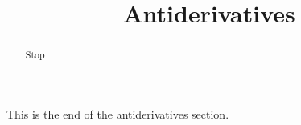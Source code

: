 \documentclass[handout]{ximera}
\title{Antiderivatives}
\begin{document}
\begin{abstract} Stop
\end{abstract}

\maketitle

This is the end of the antiderivatives section.
\end{document}
